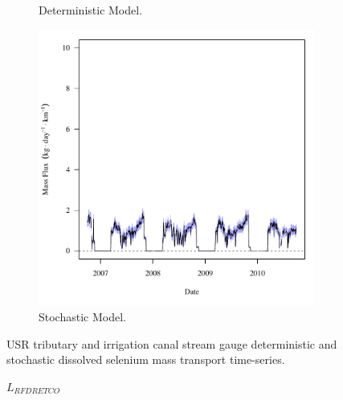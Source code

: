 \begin{linenumbers}
\begin{landscape}
\begin{figure}
\begin{subfigure}{0.7\textwidth}
			\caption{Deterministic Model.}
		\end{subfigure}%
		\begin{subfigure}{0.7\textwidth}
			\centering
			\includegraphics[width=\tableCustomSize]{"Figures/Results_USR/Stochastic/f RFD"}
			\caption{Stochastic Model.}
		\end{subfigure}
		\caption{USR tributary and irrigation canal stream gauge deterministic and stochastic dissolved selenium mass transport time-series.}
	\end{figure}
\end{landscape}
\subfiguremid
\begin{landscape}
	\begin{figure}
		$ \displaystyle L_{RFDRETCO} $
		\begin{subfigure}{0.7\textwidth}
			\centering

\end{subfigure}
\end{figure}
\end{landscape}
\end{linenumbers}
